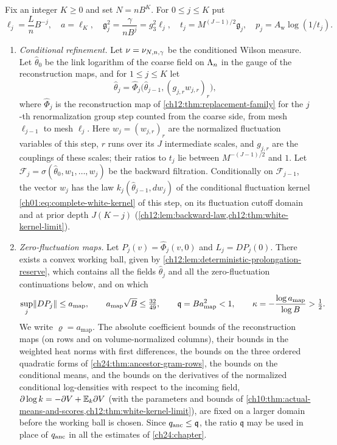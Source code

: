 \begin{definition}\label{ch30:def:paired-history}
Fix an integer $K\ge0$ and set $N=nB^K$. For $0\le j\le K$ put
\[
 \ell_j=\frac LnB^{-j},\quad a=\ell_K,\quad
 \mathfrak g_j^2=\frac{\gamma}{nB^j}=g_3^2\ell_j,\quad
 t_j=M^{(J-1)/2}\mathfrak g_j,\quad p_j=A_{\mathrm w}\log(1/t_j).
\]
\begin{enumerate}
\item \emph{Conditional refinement.} Let $\nu=\nu_{N,n,\gamma}$ be the conditioned Wilson measure. Let $\widehat\theta_0$ be the link logarithm of the coarse field on $\Lambda_{n}$ in the gauge of the reconstruction maps, and for $1\le j\le K$ let
\[
 \widehat\theta_j=\widehat\Phi_j\bigl(\widehat\theta_{j-1},(g_{j,r}w_{j,r})_r\bigr),
\]
where $\widehat\Phi_j$ is the reconstruction map of \cref{ch12:thm:replacement-family} for the $j$-th renormalization group step counted from the coarse side, from mesh $\ell_{j-1}$ to mesh $\ell_j$. Here $w_j=(w_{j,r})_r$ are the normalized fluctuation variables of this step, $r$ runs over its $J$ intermediate scales, and $g_{j,r}$ are the couplings of these scales; their ratios to $t_j$ lie between $M^{-(J-1)/2}$ and $1$. Let $\mathcal F_j=\sigma(\widehat\theta_0,w_1,\ldots,w_j)$ be the backward filtration. Conditionally on $\mathcal F_{j-1}$, the vector $w_j$ has the law $k_j(\widehat\theta_{j-1},dw_j)$ of the conditional fluctuation kernel \eqref{ch01:eq:complete-white-kernel} of this step, on its fluctuation cutoff domain and at prior depth $J(K-j)$ (\cref{ch12:lem:backward-law,ch12:thm:white-kernel-limit}).
\item \emph{Zero-fluctuation maps.} Let $P_j(v)=\widehat\Phi_j(v,0)$ and $L_j=DP_j(0)$. There exists a convex working ball, given by \cref{ch12:lem:deterministic-prolongation-reserve}, which contains all the fields $\widehat\theta_j$ and all the zero-fluctuation continuations below, and on which
\[
 \sup_j\lVert DP_j\rVert\le a_{\mathrm{map}},\qquad a_{\mathrm{map}}\sqrt B\le\tfrac{32}{49},\qquad
 \mathfrak q=Ba_{\mathrm{map}}^2<1,\qquad
 \kappa=-\frac{\log a_{\mathrm{map}}}{\log B}>\tfrac12.
\]
We write $\varrho=a_{\mathrm{map}}$. The absolute coefficient bounds of the reconstruction maps (on rows and on volume-normalized columns), their bounds in the weighted heat norms with first differences, the bounds on the three ordered quadratic forms of \cref{ch24:thm:ancestor-gram-rows}, the bounds on the conditional means, and the bounds on the derivatives of the normalized conditional log-densities with respect to the incoming field, $\partial\log k=-\partial V+\mathbb E_k\partial V$ (with the parameters and bounds of \cref{ch10:thm:actual-means-and-scores,ch12:thm:white-kernel-limit}), are fixed on a larger domain before the working ball is chosen. Since $q_{\mathrm{anc}}\le\mathfrak q$, the ratio $\mathfrak q$ may be used in place of $q_{\mathrm{anc}}$ in all the estimates of \cref{ch24:chapter}.

\end{enumerate}
\end{definition}
